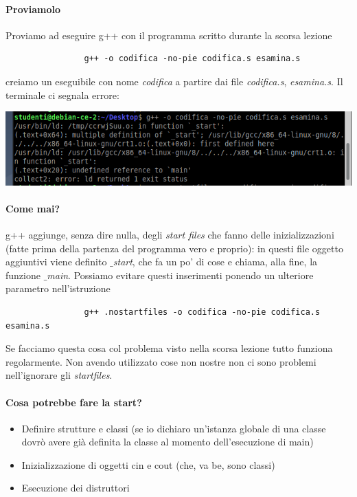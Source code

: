 			\paragraph{Proviamolo} Proviamo ad eseguire g++ con il programma scritto durante la scorsa lezione 
			\begin{verbatim}
				g++ -o codifica -no-pie codifica.s esamina.s
			\end{verbatim}
			creiamo un eseguibile con nome \emph{codifica} a partire dai file \emph{codifica.s}, \emph{esamina.s}. Il terminale ci segnala errore:
			\begin{center}
				\includegraphics[scale=.9]{img/150.PNG}
			\end{center} 
			\paragraph{Come mai?} g++ aggiunge, senza dire nulla, degli \emph{start files} che fanno delle inizializzazioni (fatte prima della partenza del programma vero e proprio): in questi file oggetto aggiuntivi viene definito \emph{$\_$start}, che fa un po' di cose e chiama, alla fine, la funzione \emph{$\_$main}. Possiamo evitare questi inserimenti ponendo un ulteriore parametro nell'istruzione
			\begin{verbatim}
				g++ .nostartfiles -o codifica -no-pie codifica.s esamina.s
			\end{verbatim}
			Se facciamo questa cosa col problema visto nella scorsa lezione tutto funziona regolarmente. Non avendo utilizzato cose non nostre non ci sono problemi nell'ignorare gli \emph{startfiles}.
			\paragraph{Cosa potrebbe fare la start?}
			\begin{itemize}
				\item Definire strutture e classi (se io dichiaro un'istanza globale di una classe dovrò avere già definita la classe al momento dell'esecuzione di main)
				\item Inizializzazione di oggetti cin e cout (che, va be, sono classi)
				\item Esecuzione dei distruttori
			\end{itemize}

